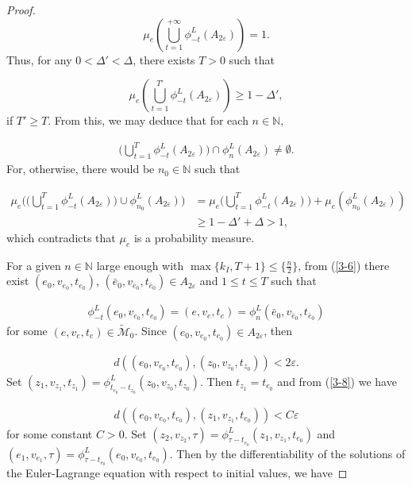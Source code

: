 \documentclass{amsart}[12pt]
\theoremstyle{definition}
\theoremstyle{remark}
\numberwithin{equation}{section}
\begin{document}
\begin{proof}
\[
\mu_e(\bigcup_{t=1}^{+\infty}\phi^L_{-t}(A_{2\varepsilon}))=1.
\]
Thus, for any $0<\Delta'<\Delta$, there exists $T>0$ such that

\[
\mu_e(\bigcup_{t=1}^{T'}\phi^L_{-t}(A_{2\varepsilon}))\geq
1-\Delta',
\]
if $T'\geq T$. From this, we may deduce that for each
$n\in\mathbb{N}$,

\begin{align}\label{3-6}
\Big(\bigcup_{t=1}^T\phi^L_{-t}(A_{2\varepsilon})\Big)\cap\phi^L_n(A_{2\varepsilon})
\neq\emptyset.
\end{align}
For, otherwise, there would be $n_0\in\mathbb{N}$ such that

\begin{align*}
\mu_e\Big(\big(\bigcup_{t=1}^T\phi^L_{-t}(A_{2\varepsilon})\big)\cup\phi^L_{n_0}(A_{2\varepsilon})\Big) & =\mu_e\Big(\bigcup_{t=1}^T\phi^L_{-t}(A_{2\varepsilon})\Big)+\mu_e(\phi^L_{n_0}(A_{2\varepsilon}))\\
                                                                                                        & \geq 1-\Delta'+\Delta>1,
\end{align*}
which contradicts that $\mu_e$ is a probability measure.

For a given $n\in\mathbb{N}$ large enough with
$\max\{k_I,T+1\}\leq\{\frac{n}{2}\}$, from (\ref{3-6}) there exist
$(e_0,v_{e_0},t_{e_0})$,
$(\bar{e}_0,v_{\bar{e}_0},t_{\bar{e}_0})\in A_{2\varepsilon}$ and
$1\leq t\leq T$ such that

\begin{align}\label{3-7}
\phi^L_{-t}(e_0,v_{e_0},t_{e_0})=(e,v_e,t_e)=\phi^L_n(\bar{e}_0,v_{\bar{e}_0},t_{\bar{e}_0})
\end{align}
for some $(e,v_e,t_e)\in \tilde{\mathcal{M}}_0$. Since
$(e_0,v_{e_0},t_{e_0})\in A_{2\varepsilon}$, then

\begin{align}\label{3-8}
d((e_0,v_{e_0},t_{e_0}),(z_0,v_{z_0},t_{z_0}))<2\varepsilon.
\end{align}
Set
$(z_1,v_{z_1},t_{z_1})=\phi^L_{t_{e_0}-t_{z_0}}(z_0,v_{z_0},t_{z_0})$.
Then $t_{z_1}=t_{e_0}$ and from (\ref{3-8}) we have

\begin{align}\label{3-9}
d((e_0,v_{e_0},t_{e_0}),(z_1,v_{z_1},t_{e_0}))<C\varepsilon
\end{align}
for some constant $C>0$.  Set
$(z_2,v_{z_2},\tau)=\phi^L_{\tau-t_{e_0}}(z_1,v_{z_1},t_{e_0})$
and
$(e_1,v_{e_1},\tau)=\phi^L_{\tau-t_{e_0}}(e_0,v_{e_0},t_{e_0})$.
Then by the differentiability of the solutions of the
Euler-Lagrange equation with respect to initial values, we have


\end{proof}
\end{document}
